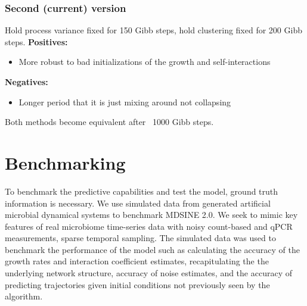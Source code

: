\documentclass{article}
\begin{document}
\subsubsection{Second (current) version}
Hold process variance fixed for 150 Gibb steps, hold clustering fixed for 200 Gibb steps.
\textbf{Positives:}
\begin{itemize}
  \item More robust to bad initializations of the growth and self-interactions
\end{itemize}
\textbf{Negatives:}
\begin{itemize}
  \item Longer period that it is just mixing around not collapsing
\end{itemize}
Both methods become equivalent after ~1000 Gibb steps.


\section{Benchmarking}
To benchmark the predictive capabilities and test the model, ground truth information is necessary. We use simulated data from generated artificial microbial dynamical systems to benchmark MDSINE 2.0. We seek to mimic key features of real microbiome time-series data with noisy count-based and qPCR measurements, sparse temporal sampling. The simulated data was used to benchmark the performance of the model such as calculating the accuracy of the growth rates and interaction coefficient estimates, recapitulating the the underlying network structure, accuracy of noise estimates, and the accuracy of predicting trajectories given initial conditions not previously seen by the algorithm.
\end{document}

